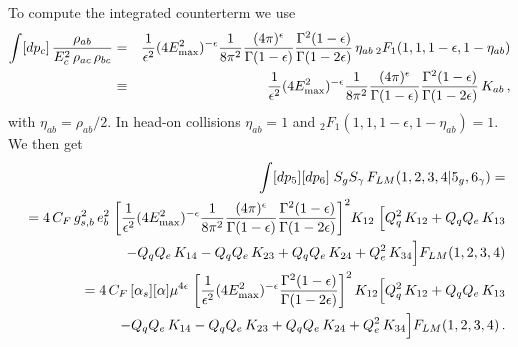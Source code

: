\documentclass[12pt,a4paper]{article}
\newcommand{\nn}{\nonumber}
\newcommand{\eps}{\epsilon}
\newcommand{\beq}{\begin{eqnarray}}
\newcommand{\eeq}{\end{eqnarray}}
\begin{document}
To compute the integrated counterterm we use
\beq
\int [dp_c] \, \frac{\rho_{ab}}{E_c^2 \, \rho_{ac} \, \rho_{bc}}
&=& \frac{1}{\eps^2} (4 E_{\rm max}^2)^{-\eps} \frac{1}{8\pi^2} \frac{(4\pi)^\eps}{\Gamma(1-\eps)}
\frac{\Gamma^2(1-\eps)}{\Gamma(1-2\eps)} \, \eta_{ab} \, {}_2F_1 (1, 1, 1-\eps, 1-\eta_{ab}) 
\nn \\
&\equiv &
 \frac{1}{\eps^2} (4 E_{\rm max}^2)^{-\eps} \frac{1}{8\pi^2} \frac{(4\pi)^\eps}{\Gamma(1-\eps)}
\frac{\Gamma^2(1-\eps)}{\Gamma(1-2\eps)} \, K_{ab}
\, , 
\label{eq:single-soft_int}
\eeq
with $\eta_{ab}= \rho_{ab}/2$. In head-on collisions $\eta_{ab}=1$ and $ {}_2F_1 (1, 1, 1-\eps, 1-\eta_{ab})=1$. We then get 
\beq
&&
\int [dp_5] [dp_6] \; S_g S_\gamma \, F_{LM}(1,2,3,4 | 5_g, 6_\gamma) 
=
\nn \\
&&
=
4 \, C_F \, g_{s,b}^2  \, e_b^2 \; 
\bigg[\frac{1}{\eps^2} (4 E_{\rm max}^2)^{-\eps} \frac{1}{8\pi^2} \frac{(4\pi)^\eps}{\Gamma(1-\eps)}
\frac{\Gamma^2(1-\eps)}{\Gamma(1-2\eps)}
\bigg]^2 
K_{12} \; 
\Big[ 
 Q^2_q \, K_{12}
+ Q_q Q_{e} \, K_{13}
\nn \\
&& \qquad  \quad 
- Q_q Q_{e} \, K_{14}
- Q_{q}Q_{e} \, K_{23}
+ Q_{q} Q_{e} \, K_{24}
+ Q^2_{e} \, K_{34}
\Big]
F_{LM}(1,2,3,4) 
\nn \\
&& =
4 \, C_F \, [\alpha_{s}] [\alpha]   \mu^{4\eps}\; 
\bigg[\frac{1}{\eps^2} (4 E_{\rm max}^2)^{-\eps} 
\frac{\Gamma^2(1-\eps)}{\Gamma(1-2\eps)}
\bigg]^2  \, K_{12} 
\Big[ 
 Q^2_q \, K_{12}
+ Q_q Q_{e} \, K_{13}
\nn \\
&& \quad  
- Q_q Q_{e} \, K_{14}
- Q_{q}Q_{e} \, K_{23}
+ Q_{q} Q_{e} \, K_{24}
+ Q^2_{e} \, K_{34}
 \Big]
F_{LM}(1,2,3,4)  \, .
\eeq
\end{document}
